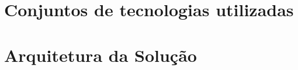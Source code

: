 \documentclass[
	12pt,				%
	openright,			%
	oneside,			%
	a4paper,			%
	english,			%
	french,				%
	spanish,			%
	brazil				%
	sumário=tradicional
	]{elementos/customizacao}
\begin{document}



%


\chapter{Conjuntos de tecnologias utilizadas}


\chapter{Arquitetura da Solução}




\end{document}
